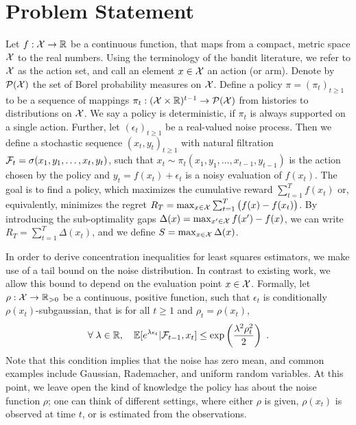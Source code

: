 \section{Problem Statement}\label{section: problem statement}

Let $f: \mathcal{X} \rightarrow \mathbb{R}$ be a continuous function, that maps from a compact, metric space $\mathcal{X}$ to the real numbers. Using the terminology of the bandit literature, we refer to $\mathcal{X}$ as the action set, and call an element $x \in \mathcal{X}$ an action (or arm). Denote by $\mathcal{P}(\mathcal{X})$ the set of Borel probability measures on $\mathcal{X}$. Define a policy $\pi = (\pi_t)_{t\geq 1}$ to be a sequence of mappings $\pi_t :  (\mathcal{X} \times \mathbb{R})^{t-1} \rightarrow \mathcal{P}(\mathcal{X})$ from histories to distributions on $\mathcal{X}$. We say a policy is deterministic, if $\pi_t$ is always supported on a single action. Further, let $(\epsilon_t)_{t\geq 1}$ be a real-valued noise process. Then we define a stochastic sequence $(x_t, y_t)_{t\geq 1}$ with natural filtration $\mathcal{F}_t = \sigma(x_1, y_1, \dots, x_t, y_t)$, such that $x_t \sim \pi_t(x_1,y_1, \dots, x_{t-1},y_{t-1})$ is the action chosen by the policy and $y_t = f(x_t) + \epsilon_t$ is a noisy evaluation of $f(x_t)$. The goal is to find a policy, which maximizes the cumulative reward $\sum_{t=1}^T f(x_t)$ or, equivalently, minimizes the regret $R_T = \max_{x\in \mathcal{X}}\sum_{t=1}^T \big( f(x) - f(x_t) \big)$. By introducing the sub-optimality gaps \linebreak $\Delta(x) = \max_{x' \in \mathcal{X}}f(x') - f(x)$, we can write $R_T = \sum_{t=1}^T \Delta(x_t)$, and we define $S = \max_{x \in \mathcal{X}} \Delta(x)$.

In order to derive concentration inequalities for least squares estimators, we make use of a tail bound on the noise distribution. In contrast to existing work, we allow this bound to depend on the evaluation point $x \in \mathcal{X}$. Formally, let $\rho : \mathcal{X} \rightarrow \mathbb{R}_{> 0}$ be a continuous, positive function, such that $\epsilon_t$ is conditionally $\rho(x_t)$-subgaussian, that is for all $t \geq 1$ and $\rho_t = \rho(x_t)$,
\begin{align}
\forall\; \lambda \in \mathbb{R}, \quad \mathbb{E}[e^{\lambda\epsilon_t} | \mathcal{F}_{t-1}, x_t] \leq \exp\left(\frac{\lambda^2 \rho_t^2}{2}\right) \text{ .}\label{eq: noise assumption}
\end{align}
Note that this condition implies that the noise has zero mean, and common examples include Gaussian, Rademacher, and uniform random variables. At this point, we leave open the kind of knowledge the policy has about the noise function $\rho$; one can think of different settings, where either $\rho$ is given, $\rho(x_t)$ is observed at time $t$, or is estimated from the observations.

